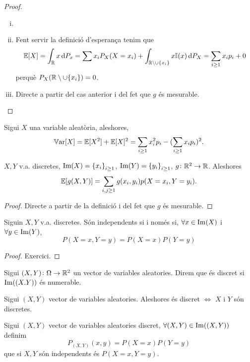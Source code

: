 \begin{proof}
    \begin{enumerate}[i)]
        \item[]
        \item Fent servir la definició d'esperança tenim que
	  \[ \esp[X] = \int_{\real}{x\dif P_x} = \sum{x_i P_X(X=x_i) + \int_{\real\setminus\cup\{x_i\}}{x\mathbb{I}(x) \dif P_X}} = \sum_{i \ge 1}{x_i p_i} + 0\]
            perquè $P_X(\mathbb{R}\setminus\cup\{x_i\}) = 0$.
        \item Directe a partir del cas anterior i del fet que $g$ és mesurable.
    \end{enumerate}
\end{proof}

\begin{obs}
    Sigui $X$ una variable aleatòria, aleshores,
    \[\operatorname{\mathbb{V}ar}[X] = \operatorname{\mathbb{E}}[X^2] + \operatorname{\mathbb{E}}[X]^2 = \sum_{i \ge 1}{x_i^2 p_i} - (\sum_{i \ge 1}{x_i p_i})^2.\]
\end{obs}

\begin{prop}
    $X, Y$ v.a. discretes, $\operatorname{Im}(X) = \left\{ x_i \right\}_{i \ge 1}$, $\operatorname{Im}(Y) = \left\{ y_i \right\}_{i \ge 1}$, $g\colon \mathbb{R}^2\to\mathbb{R}$. Aleshores
    \[\operatorname{\mathbb{E}}[g(X,Y)] = \sum_{i,j \ge 1}{g(x_i,y_i) p(X=x_i, Y=y_i)}.\]
\end{prop}
\begin{proof}
    Directe a partir de la definició i del fet que $g$ és mesurable.
\end{proof}


\begin{prop}
    Siguin $X,Y$ v.a. discretes. Són independents si i només si, $\forall x \in\operatorname{Im}(X)$ i $\forall y \in\operatorname{Im}(Y)$,
    \[P(X=x, Y=y) = P(X=x)P(Y=y)\]
\end{prop}
\begin{proof}
    Exercici.
\end{proof}


\begin{defi}
    Sigui $(X,Y)\colon \Omega\to\mathbb{R}^2$ un vector de variables aleatories. Direm que és discret si $\operatorname{Im}((X.Y))$ és numerable.
\end{defi}

\begin{obs}
    Sigui $(X,Y)$ vector de variables aleatories. Aleshores és discret $\iff$ $X$ i $Y$ són discretes.
\end{obs}

\begin{defi}
    Sigui $(X,Y)$ vector de variables aleatories discret, $\forall(X,Y) \in \operatorname{Im}((X,Y))$ definim
    \[P_{(X,Y)}(x,y) = P(X=x)P(Y=y)\]
    que si $X,Y$ són independents és $P(X=x,Y=y)$.
\end{defi}

